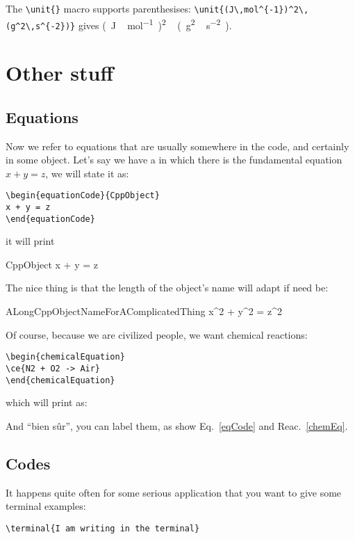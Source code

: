 \documentclass{documentation}
\begin{document}
The \verb!\unit{}! macro supports parenthesises:
\verb!\unit{(J\,mol^{-1})^2\,(g^2\,s^{-2})}! gives
\unit{(J\,mol^{-1})^2\,(g^2\,s^{-2})}.

\chapter{Other stuff}

\section{Equations}

Now we refer to equations that are usually somewhere in the
code, and certainly in some object. Let's say we have a
in which there is the fundamental equation
$x + y = z$, we will state it as:
\begin{verbatim}
\begin{equationCode}{CppObject}
x + y = z
\end{equationCode}
\end{verbatim}
it will print
\begin{equationCode}{CppObject}
x + y = z
\label{eqCode}
\end{equationCode}
The nice thing is that the length of the object's name will adapt
if need be:
\begin{equationCode}{ALongCppObjectNameForAComplicatedThing}
x^2 + y^2 = z^2
\end{equationCode}

Of course, because we are civilized people, we want chemical
reactions:
\begin{verbatim}
\begin{chemicalEquation}
\ce{N2 + O2 -> Air}
\end{chemicalEquation}
\end{verbatim}
which will print as:
\begin{chemicalEquation}
\label{chemEq}
\end{chemicalEquation}

And ``bien s\^ur'', you can label them, as show Eq.~\ref{eqCode} and
Reac.~\ref{chemEq}.

\section{Codes}

It happens quite often for some serious application that
you want to give some terminal examples:
\begin{verbatim}
\terminal{I am writing in the terminal}
\end{verbatim}
\end{document}
